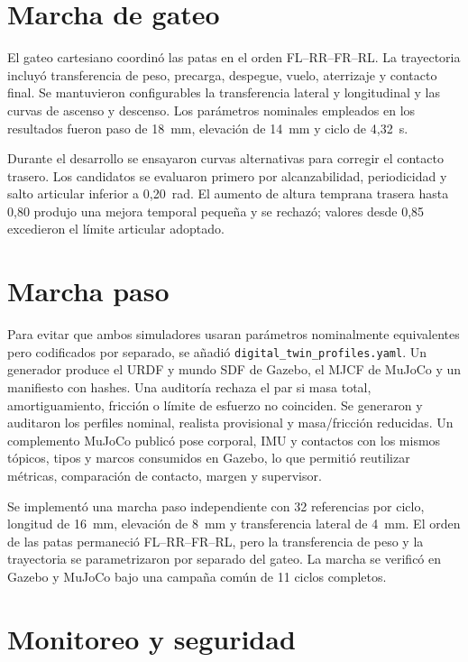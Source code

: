\section{Marcha de gateo}

El gateo cartesiano coordinó las patas en el orden FL--RR--FR--RL. La trayectoria
incluyó transferencia de peso, precarga, despegue, vuelo, aterrizaje y contacto
final. Se mantuvieron configurables la transferencia lateral y longitudinal y
las curvas de ascenso y descenso. Los parámetros nominales empleados en los
resultados fueron paso de 18~mm, elevación de 14~mm y ciclo de 4,32~s.

Durante el desarrollo se ensayaron curvas alternativas para corregir el contacto
trasero. Los candidatos se evaluaron primero por alcanzabilidad, periodicidad y
salto articular inferior a 0,20~rad. El aumento de altura temprana trasera hasta
0,80 produjo una mejora temporal pequeña y se rechazó; valores desde 0,85
excedieron el límite articular adoptado.

\section{Marcha paso}

Para evitar que ambos simuladores usaran parámetros nominalmente equivalentes
pero codificados por separado, se añadió
\texttt{digital\_twin\_profiles.yaml}. Un generador produce el URDF y mundo SDF
de Gazebo, el MJCF de MuJoCo y un manifiesto con hashes. Una auditoría rechaza
el par si masa total, amortiguamiento, fricción o límite de esfuerzo no
coinciden. Se generaron y auditaron los perfiles nominal, realista provisional
y masa/fricción reducidas. Un complemento MuJoCo publicó pose corporal, IMU y
contactos con los mismos tópicos, tipos y marcos consumidos en Gazebo, lo que
permitió reutilizar métricas, comparación de contacto, margen y supervisor.

Se implementó una marcha paso independiente con 32 referencias por ciclo,
longitud de 16~mm, elevación de 8~mm y transferencia lateral de 4~mm. El orden
de las patas permaneció FL--RR--FR--RL, pero la transferencia de peso y la
trayectoria se parametrizaron por separado del gateo. La marcha se verificó en
Gazebo y MuJoCo bajo una campaña común de 11 ciclos completos.

\section{Monitoreo y seguridad}

